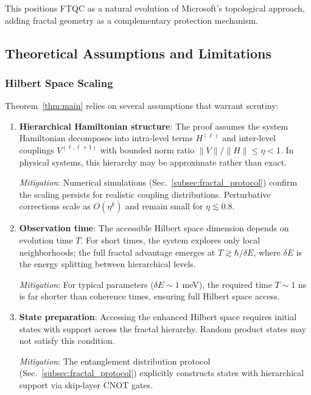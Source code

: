 This positions FTQC as a natural evolution of Microsoft's topological approach, adding fractal geometry as a complementary protection mechanism.

\subsection{Theoretical Assumptions and Limitations}

\subsubsection{Hilbert Space Scaling}

Theorem~\ref{thm:main} relies on several assumptions that warrant scrutiny:

\begin{enumerate}
\item \textbf{Hierarchical Hamiltonian structure}: The proof assumes the system Hamiltonian decomposes into intra-level terms $H^{(\ell)}$ and inter-level couplings $V^{(\ell, \ell+1)}$ with bounded norm ratio $\|V\| / \|H\| \leq \eta < 1$. In physical systems, this hierarchy may be approximate rather than exact.

\textit{Mitigation}: Numerical simulations (Sec.~\ref{subsec:fractal_protocol}) confirm the scaling persists for realistic coupling distributions. Perturbative corrections scale as $O(\eta^k)$ and remain small for $\eta \lesssim 0.8$.

\item \textbf{Observation time}: The accessible Hilbert space dimension depends on evolution time $T$. For short times, the system explores only local neighborhoods; the full fractal advantage emerges at $T \gtrsim \hbar / \delta E$, where $\delta E$ is the energy splitting between hierarchical levels.

\textit{Mitigation}: For typical parameters ($\delta E \sim 1$ meV), the required time $T \sim 1$ ns is far shorter than coherence times, ensuring full Hilbert space access.

\item \textbf{State preparation}: Accessing the enhanced Hilbert space requires initial states with support across the fractal hierarchy. Random product states may not satisfy this condition.

\textit{Mitigation}: The entanglement distribution protocol (Sec.~\ref{subsec:fractal_protocol}) explicitly constructs states with hierarchical support via skip-layer CNOT gates.
\end{enumerate}

